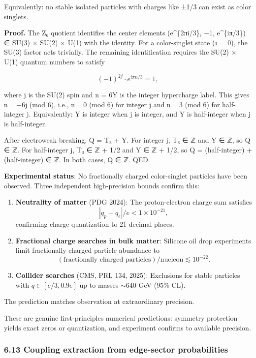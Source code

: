 \documentclass[
]{article}
\begin{document}
Equivalently: no stable isolated particles with charges like ±1/3 can
exist as color singlets.

\textbf{Proof.} The Z₆ quotient identifies the center elements
(e\^{}\{2πi/3\}, −1, e\^{}\{iπ/3\}) ∈ SU(3) × SU(2) × U(1) with the
identity. For a color-singlet state (τ = 0), the SU(3) factor acts
trivially. The remaining identification requires the SU(2) × U(1)
quantum numbers to satisfy

\[
(-1)^{2j} \cdot e^{i\pi n/3} = 1,
\]

where j is the SU(2) spin and n = 6Y is the integer hypercharge label.
This gives n ≡ −6j (mod 6), i.e., n ≡ 0 (mod 6) for integer j and n ≡ 3
(mod 6) for half-integer j. Equivalently: Y is integer when j is
integer, and Y is half-integer when j is half-integer.

After electroweak breaking, Q = T₃ + Y. For integer j, T₃ ∈ ℤ and Y ∈ ℤ,
so Q ∈ ℤ. For half-integer j, T₃ ∈ ℤ + 1/2 and Y ∈ ℤ + 1/2, so Q =
(half-integer) + (half-integer) ∈ ℤ. In both cases, Q ∈ ℤ. QED.

\textbf{Experimental status}: No fractionally charged color-singlet
particles have been observed. Three independent high-precision bounds
confirm this:

\begin{enumerate}
\def\labelenumi{\arabic{enumi}.}
\item
  \textbf{Neutrality of matter} (PDG 2024): The proton-electron charge
  sum satisfies \[|q_p + q_e|/e < 1 \times 10^{-21},\] confirming charge
  quantization to 21 decimal places.
\item
  \textbf{Fractional charge searches in bulk matter}: Silicone oil drop
  experiments limit fractionally charged particle abundance to
  \[(\text{fractionally charged particles})/\text{nucleon} \lesssim 10^{-22}.\]
\item
  \textbf{Collider searches} (CMS, PRL 134, 2025): Exclusions for stable
  particles with \(q \in [e/3, 0.9e]\) up to masses \(\sim 640\) GeV
  (95\% CL).
\end{enumerate}

The prediction matches observation at extraordinary precision.

These are genuine first-principles numerical predictions: symmetry
protection yields exact zeros or quantization, and experiment confirms
to available precision.

\subsubsection{6.13 Coupling extraction from edge-sector
probabilities}\label{coupling-extraction-from-edge-sector-probabilities}
\end{document}
